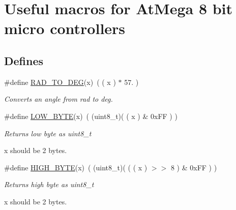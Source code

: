 \hypertarget{group___a_t_m_e_g_e___m_a_c_r_o_s}{\section{\-Useful macros for \-At\-Mega 8 bit micro controllers}
\label{group___a_t_m_e_g_e___m_a_c_r_o_s}
}
\subsection*{\-Defines}
\begin{DoxyCompactItemize}
\item 
\hypertarget{group___a_t_m_e_g_e___m_a_c_r_o_s_ga77dd57594a038f87051b324cee42c531}{\#define \hyperlink{group___a_t_m_e_g_e___m_a_c_r_o_s_ga77dd57594a038f87051b324cee42c531}{\-R\-A\-D\-\_\-\-T\-O\-\_\-\-D\-E\-G}(x)~( ( x ) $\ast$ 57. )}\label{group___a_t_m_e_g_e___m_a_c_r_o_s_ga77dd57594a038f87051b324cee42c531}

\begin{DoxyCompactList}\small\item\em \-Converts an angle from rad to deg. \end{DoxyCompactList}\item 
\hypertarget{group___a_t_m_e_g_e___m_a_c_r_o_s_gaaf16148e7a910d20df2da6bcf300ea25}{\#define \hyperlink{group___a_t_m_e_g_e___m_a_c_r_o_s_gaaf16148e7a910d20df2da6bcf300ea25}{\-L\-O\-W\-\_\-\-B\-Y\-T\-E}(x)~( (uint8\-\_\-t)( ( x ) \& 0x\-F\-F ) )}\label{group___a_t_m_e_g_e___m_a_c_r_o_s_gaaf16148e7a910d20df2da6bcf300ea25}

\begin{DoxyCompactList}\small\item\em \-Returns low byte as uint8\-\_\-t \par
 x should be 2 bytes. \end{DoxyCompactList}\item 
\hypertarget{group___a_t_m_e_g_e___m_a_c_r_o_s_ga414e62382b4f31e419c3dce2bd833ca7}{\#define \hyperlink{group___a_t_m_e_g_e___m_a_c_r_o_s_ga414e62382b4f31e419c3dce2bd833ca7}{\-H\-I\-G\-H\-\_\-\-B\-Y\-T\-E}(x)~( (uint8\-\_\-t)( ( ( x ) $>$$>$ 8 ) \& 0x\-F\-F ) )}\label{group___a_t_m_e_g_e___m_a_c_r_o_s_ga414e62382b4f31e419c3dce2bd833ca7}

\begin{DoxyCompactList}\small\item\em \-Returns high byte as uint8\-\_\-t\par
 x should be 2 bytes. \end{DoxyCompactList}\end{DoxyCompactItemize}
